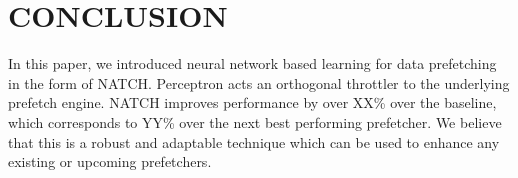 \section{CONCLUSION}
\label{Conclusion}
In this paper, we introduced neural network based learning for data
prefetching in the form of NATCH.  Perceptron acts an orthogonal
throttler to the underlying prefetch engine.  NATCH improves
performance by over XX\% over the baseline, which corresponds to YY\%
over the next best performing prefetcher.  
We believe that this is a robust and adaptable technique which can
be used to enhance any existing or upcoming prefetchers.
